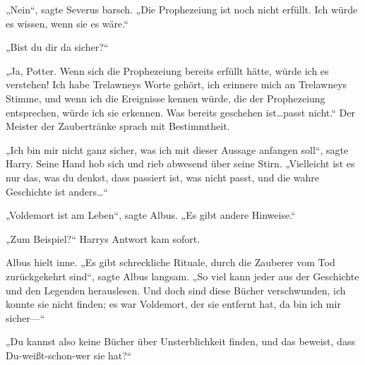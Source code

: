 „Nein“, sagte Severus barsch. „Die Prophezeiung ist noch nicht erfüllt. Ich würde es wissen, wenn sie es wäre.“

„Bist du dir da sicher?“

„Ja, Potter. Wenn sich die Prophezeiung bereits erfüllt hätte, würde ich es verstehen! Ich habe Trelawneys Worte gehört, ich erinnere mich an Trelawneys Stimme, und wenn ich die Ereignisse kennen würde, die der Prophezeiung entsprechen, würde ich sie erkennen. Was bereits geschehen ist…passt nicht.“ Der Meister der Zaubertränke sprach mit Bestimmtheit.

„Ich bin mir nicht ganz sicher, was ich mit dieser Aussage anfangen soll“, sagte Harry. Seine Hand hob sich und rieb abwesend über seine Stirn. „Vielleicht ist es nur das, was du denkst, dass passiert ist, was nicht passt, und die wahre Geschichte ist anders…“

„Voldemort ist am Leben“, sagte Albus. „Es gibt andere Hinweise.“

„Zum Beispiel?“ Harrys Antwort kam sofort.

Albus hielt inne. „Es gibt schreckliche Rituale, durch die Zauberer vom Tod zurückgekehrt sind“, sagte Albus langsam. „So viel kann jeder aus der Geschichte und den Legenden herauslesen. Und doch sind diese Bücher verschwunden, ich konnte sie nicht finden; es war Voldemort, der sie entfernt hat, da bin ich mir sicher—“

„Du kannst also keine Bücher über Unsterblichkeit finden, und das beweist, dass Du-weißt-schon-wer sie hat?“

